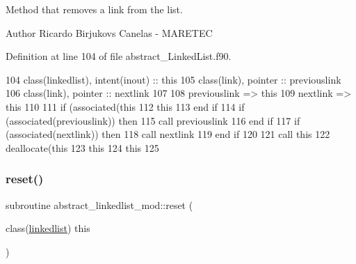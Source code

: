 Method that removes a link from the list. 

\begin{DoxyAuthor}{Author}
Ricardo Birjukovs Canelas -\/ M\+A\+R\+E\+T\+EC 
\end{DoxyAuthor}


Definition at line 104 of file abstract\+\_\+\+Linked\+List.\+f90.


\begin{DoxyCode}
104     \textcolor{keywordtype}{class}(linkedlist), \textcolor{keywordtype}{intent(inout)} :: this    
105     \textcolor{keywordtype}{class}(link), \textcolor{keywordtype}{pointer} :: previouslink
106     \textcolor{keywordtype}{class}(link), \textcolor{keywordtype}{pointer} :: nextlink 
107     
108     previouslink => this%
109     nextlink => this%
110     
111     \textcolor{keywordflow}{if} (\textcolor{keyword}{associated}(this%
112         this%
113 \textcolor{keywordflow}{    end if}
114     \textcolor{keywordflow}{if} (\textcolor{keyword}{associated}(previouslink)) \textcolor{keywordflow}{then}
115         \textcolor{keyword}{call }previouslink%
116 \textcolor{keywordflow}{    end if}
117     \textcolor{keywordflow}{if} (\textcolor{keyword}{associated}(nextlink)) \textcolor{keywordflow}{then}
118         \textcolor{keyword}{call }nextlink%
119 \textcolor{keywordflow}{    end if}
120     
121     \textcolor{keyword}{call }this%
122     \textcolor{keyword}{deallocate}(this%
123     this%
124     this%
125     
\end{DoxyCode}
\mbox{\label{namespaceabstract__linkedlist__mod_a46ff8b8a3ab81610eb47d72d742778c3}} 
\subsubsection{\texorpdfstring{reset()}{reset()}}
{\footnotesize\ttfamily subroutine abstract\+\_\+linkedlist\+\_\+mod\+::reset (\begin{DoxyParamCaption}\item[{class(\mbox{\hyperlink{structabstract__linkedlist__mod_1_1linkedlist}{linkedlist}})}]{this }\end{DoxyParamCaption})\hspace{0.3cm}{\ttfamily [private]}}



